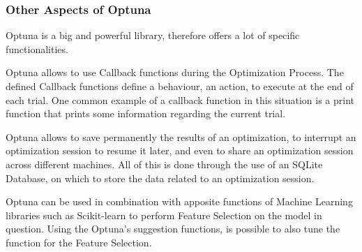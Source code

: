 \subsubsection{Other Aspects of Optuna}

Optuna is a big and powerful library, therefore offers a lot of specific functionalities.

Optuna allows to use Callback functions during the Optimization Process.
The defined Callback functions define a behaviour, an action, to execute at the end of each trial.
One common example of a callback function in this situation is a print function that prints some information regarding the current trial.

Optuna allows to save permanently the results of an optimization, to interrupt an optimization session to resume it later, and even to share an optimization session across different machines.
All of this is done through the use of an SQLite Database, on which to store the data related to an optimization session.

Optuna can be used in combination with apposite functions of Machine Learning libraries such as Scikit-learn to perform Feature Selection on the model in question.
Using the Optuna's suggestion functions, is possible to also tune the function for the Feature Selection.

